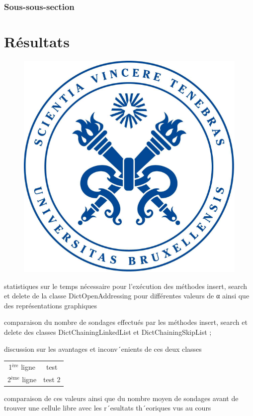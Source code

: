 \documentclass[utf8]{article}
\begin{document}
\subsubsection{Sous-sous-section}

\newpage

\section{Résultats}
    \begin{figure}[H]
  \centering
	\includegraphics[scale=0.4]{img/logo.png}
  \label{fig:logo}
\end{figure}

     statistiques sur le temps nécessaire pour l’exécution des méthodes insert, search et delete de
la classe DictOpenAddressing pour différentes valeurs de α ainsi que des représentations graphiques

    comparaison du nombre de sondages effectués par les méthodes insert, search et delete des
classes DictChainingLinkedList et DictChainingSkipList ;
    
    discussion sur les avantages et inconv´enients de ces deux classes
\begin{center}
\begin{tabular}{|c|c|}
\hline
1$^{\text{ère}}$ ligne & test \\
2$^{\text{ème}}$ ligne & test 2 \\
 
\hline
\end{tabular}
\end{center}
comparaison de ces valeurs ainsi que du nombre moyen de sondages avant de trouver une cellule
libre avec les r´esultats th´eoriques vus au cours
\end{document}
